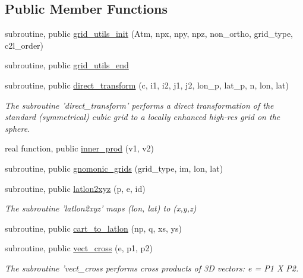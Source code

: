 \subsection*{Public Member Functions}
\begin{DoxyCompactItemize}
\item 
subroutine, public \hyperlink{classfv__grid__utils__mod_aaa8f8fb3b9726914e96ab905b0bfbdc2}{grid\-\_\-utils\-\_\-init} (Atm, npx, npy, npz, non\-\_\-ortho, grid\-\_\-type, c2l\-\_\-order)
\item 
subroutine, public \hyperlink{classfv__grid__utils__mod_adb11ef287b3b75568f3648d3984e3b33}{grid\-\_\-utils\-\_\-end}
\item 
subroutine, public \hyperlink{classfv__grid__utils__mod_adc930675e4ce60effc5d7b2f34b21ed5}{direct\-\_\-transform} (c, i1, i2, j1, j2, lon\-\_\-p, lat\-\_\-p, n, lon, lat)
\begin{DoxyCompactList}\small\item\em The subroutine 'direct\-\_\-transform' performs a direct transformation of the standard (symmetrical) cubic grid to a locally enhanced high-\/res grid on the sphere. \end{DoxyCompactList}\item 
real function, public \hyperlink{classfv__grid__utils__mod_a9e4bf88962e6eecc388ca075e641d13f}{inner\-\_\-prod} (v1, v2)
\item 
subroutine, public \hyperlink{classfv__grid__utils__mod_a3fc07f828529992d0efe95fbd361254c}{gnomonic\-\_\-grids} (grid\-\_\-type, im, lon, lat)
\item 
subroutine, public \hyperlink{classfv__grid__utils__mod_a175b576930b1aabccbdc22918e3eabe7}{latlon2xyz} (p, e, id)
\begin{DoxyCompactList}\small\item\em The subroutine 'latlon2xyz' maps (lon, lat) to (x,y,z) \end{DoxyCompactList}\item 
subroutine, public \hyperlink{classfv__grid__utils__mod_a85755bc87f196f58a1c8af1b4af9b2ac}{cart\-\_\-to\-\_\-latlon} (np, q, xs, ys)
\item 
subroutine, public \hyperlink{classfv__grid__utils__mod_a685f32d9d18924cf1e743f96b1dbe493}{vect\-\_\-cross} (e, p1, p2)
\begin{DoxyCompactList}\small\item\em The subroutine 'vect\-\_\-cross performs cross products of 3\-D vectors\-: e = P1 X P2. \end{DoxyCompactList}\item 

\end{DoxyCompactItemize}
